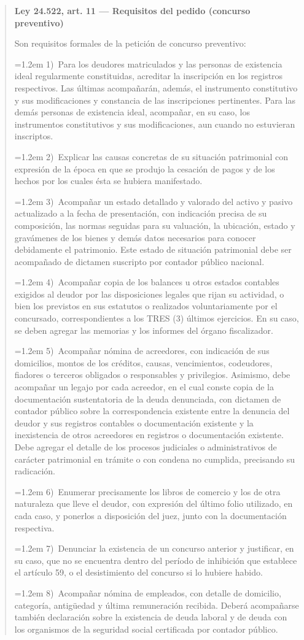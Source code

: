 \documentclass[12pt,oneside]{book}
\newenvironment{articulo}[1]
  {\begin{quote}\small\textbf{#1}\par\smallskip}
  {\end{quote}}
\newcommand{\inciso}[2]{\par\noindent\hangindent=1.2em\hangafter=1 #1)~#2}
\begin{document}
\begin{articulo}{Ley 24.522, art. 11 --- Requisitos del pedido (concurso preventivo)}
Son requisitos formales de la petición de concurso preventivo:
\inciso{1}{Para los deudores matriculados y las personas de existencia ideal regularmente constituidas, acreditar la inscripción en los registros respectivos. Las últimas acompañarán, además, el instrumento constitutivo y sus modificaciones y constancia de las inscripciones pertinentes. Para las demás personas de existencia ideal, acompañar, en su caso, los instrumentos constitutivos y sus modificaciones, aun cuando no estuvieran inscriptos.}
\inciso{2}{Explicar las causas concretas de su situación patrimonial con expresión de la época en que se produjo la cesación de pagos y de los hechos por los cuales ésta se hubiera manifestado.}
\inciso{3}{Acompañar un estado detallado y valorado del activo y pasivo actualizado a la fecha de presentación, con indicación precisa de su composición, las normas seguidas para su valuación, la ubicación, estado y gravámenes de los bienes y demás datos necesarios para conocer debidamente el patrimonio. Este estado de situación patrimonial debe ser acompañado de dictamen suscripto por contador público nacional.}
\inciso{4}{Acompañar copia de los balances u otros estados contables exigidos al deudor por las disposiciones legales que rijan su actividad, o bien los previstos en sus estatutos o realizados voluntariamente por el concursado, correspondientes a los TRES (3) últimos ejercicios. En su caso, se deben agregar las memorias y los informes del órgano fiscalizador.}
\inciso{5}{Acompañar nómina de acreedores, con indicación de sus domicilios, montos de los créditos, causas, vencimientos, codeudores, fiadores o terceros obligados o responsables y privilegios. Asimismo, debe acompañar un legajo por cada acreedor, en el cual conste copia de la documentación sustentatoria de la deuda denunciada, con dictamen de contador público sobre la correspondencia existente entre la denuncia del deudor y sus registros contables o documentación existente y la inexistencia de otros acreedores en registros o documentación existente. Debe agregar el detalle de los procesos judiciales o administrativos de carácter patrimonial en trámite o con condena no cumplida, precisando su radicación.}
\inciso{6}{Enumerar precisamente los libros de comercio y los de otra naturaleza que lleve el deudor, con expresión del último folio utilizado, en cada caso, y ponerlos a disposición del juez, junto con la documentación respectiva.}
\inciso{7}{Denunciar la existencia de un concurso anterior y justificar, en su caso, que no se encuentra dentro del período de inhibición que establece el artículo 59, o el desistimiento del concurso si lo hubiere habido.}
\inciso{8}{Acompañar nómina de empleados, con detalle de domicilio, categoría, antigüedad y última remuneración recibida. Deberá acompañarse también declaración sobre la existencia de deuda laboral y de deuda con los organismos de la seguridad social certificada por contador público.}


\end{articulo}
\end{document}
